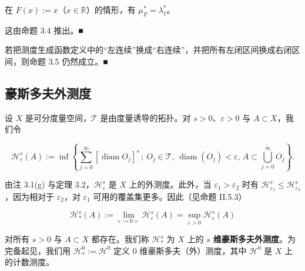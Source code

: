 \begin{remark}

\begin{items}
\item

在 $ F(x) := x $（$ x \in \mathbb{R} $）的情形，有 $ \mu_F^* = \lambda_1^* $。

\proofhead
这由命题 3.4 推出。\nobreak\hspace{0.35em}■
\item

若把测度生成函数定义中的“左连续”换成“右连续”，并把所有左闭区间换成右闭区间，则命题 3.5 仍然成立。\nobreak\hspace{0.35em}■

\end{items}

\end{remark}

\subsection*{豪斯多夫外测度}

设 $ X $ 是可分度量空间，$ \mathcal{T} $ 是由度量诱导的拓扑。对 $ s > 0 $、$ \varepsilon > 0 $ 与 $ A \subset X $，我们令

\[
\mathcal{H}_\varepsilon^s(A) := \inf\left\{ \sum_{j=0}^{\infty} [\operatorname{diam} O_j]^s \,;\ O_j \in \mathcal{T},\, \operatorname{diam}(O_j) < \varepsilon,\, A \subset \bigcup_{j=0}^{\infty} O_j \right\} .
\]

由注 3.1(g) 与定理 3.2，$ \mathcal{H}_\varepsilon^s $ 是 $ X $ 上的外测度。此外，当 $ \varepsilon_1 > \varepsilon_2 $ 时有 $ \mathcal{H}_{\varepsilon_1}^s \le \mathcal{H}_{\varepsilon_2}^s $，因为相对于 $ \varepsilon_2 $，对 $ \varepsilon_1 $ 可用的覆盖集更多。因此（见命题 II.5.3）

\[
\mathcal{H}_*^s(A) := \lim_{\varepsilon \to 0+} \mathcal{H}_\varepsilon^s(A) = \sup_{\varepsilon > 0} \mathcal{H}_\varepsilon^s(A)
\]

对所有 $ s > 0 $ 与 $ A \subset X $ 都存在。我们称 $ \mathcal{H}_*^s $ 为 $ X $ 上的 \textbf{$ s $ 维豪斯多夫外测度}。为完备起见，我们用 $ \mathcal{H}_*^0 := \mathcal{H}^0 $ 定义 0 维豪斯多夫（外）测度，其中 $ \mathcal{H}^0 $ 是 $ X $ 上的计数测度。

